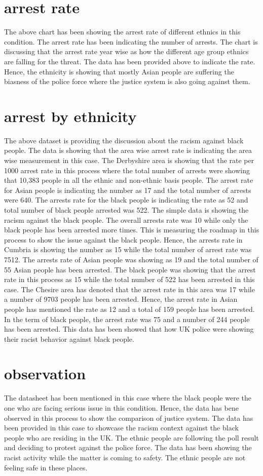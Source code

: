 \documentclass[conference]{IEEEtran}
\begin{document}
\section{arrest rate}
The above chart has been showing the arrest rate of different ethnics in this condition. The arrest rate has been indicating the number of arrests. The chart is discussing that the arrest rate year wise as how the different age group ethnics are falling for the threat. The data has been provided above to indicate the rate. Hence, the ethnicity is showing that mostly Asian people are suffering the biasness of the police force where the justice system is also going against them.
\section{arrest by ethnicity}
The above dataset is providing the discussion about the racism against black people. The data is showing that the area wise arrest rate is indicating the area wise measurement in this case. The Derbyshire area is showing that the rate per 1000 arrest rate in this process where the total number of arrests were showing that 10,383 people in all the ethnic and non-ethnic basis people. The arrest rate for Asian people is indicating the number as 17 and the total number of arrests were 640. The arrests rate for the black people is indicating the rate as 52 and total number of black people arrested was 522. The simple data is showing the racism against the black people. The overall arrests rate was 10 while only the black people has been arrested more times. 
This is measuring the roadmap in this process to show the issue against the black people. Hence, the arrests rate in Cumbria is showing the number as 15 while the total number of arrest rate was 7512. The arrests rate of Asian people was showing as 19 and the total number of 55 Asian people has been arrested. The black people was showing that the arrest rate in this process as 15 while the total number of 522 has been arrested in this case. The Chesire area has denoted that the arrest rate in this area was 17 while a number of 9703 people has been arrested. Hence, the arrest rate in Asian people has mentioned the rate as 12 and a total of 159 people has been arrested. In the term of black people, the arrest rate was 75 and a number of 244 people has been arrested. This data has been showed that how UK police were showing their racist behavior against black people. 
\section{observation}
The datasheet has been mentioned in this case where the black people were the one who are facing serious issue in this condition. Hence, the data has bene observed in this process to show the comparison of justice system. The data has been provided in this case to showcase the racism context against the black people who are residing in the UK. The ethnic people are following the poll result and deciding to protest against the police force. The data has been showing the racist activity while the matter is coming to safety. The ethnic people are not feeling safe in these places.
\end{document}
